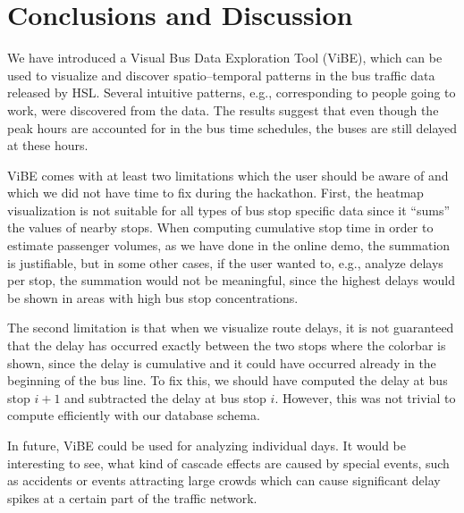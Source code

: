 \documentclass[a4paper,12pt]{article}
\begin{document}
\section{Conclusions and Discussion} \label{sec:conc}

We have introduced a Visual Bus Data Exploration Tool (ViBE), which can be used 
to visualize and discover spatio--temporal patterns in the bus traffic data 
released by HSL. Several intuitive patterns, e.g., corresponding to people 
going to work, were discovered from the data. The results suggest that even 
though the peak hours are accounted for in the bus time schedules, the buses 
are still delayed at these hours.

ViBE comes with at least two limitations which the user should be aware of and 
which we did not have time to fix during the hackathon. First, the heatmap 
visualization is not suitable for all types of bus stop specific data since it 
``sums'' the values of nearby stops. When computing cumulative stop time in 
order to estimate passenger volumes, as we have done in the online demo, the 
summation is justifiable, but in some other cases, if the user wanted to, e.g., 
analyze delays per stop, the summation would not be meaningful, since the 
highest delays would be shown in areas with high bus stop concentrations. 

The second limitation is that when we visualize route delays, it is not 
guaranteed that the delay has occurred exactly between the two stops 
where the colorbar is shown, since the delay is cumulative and it could have 
occurred already in the beginning of the bus line. To fix this, we should have 
computed the delay at bus stop $i+1$ and subtracted the delay at bus stop $i$. 
However, this was not trivial to compute efficiently with our database schema.

In future, ViBE could be used for analyzing individual days. It would be 
interesting to see, what kind of cascade effects are caused by special events, 
such as accidents or events attracting large crowds which can cause significant 
delay spikes at a certain part of the traffic network.

%
\end{document}
